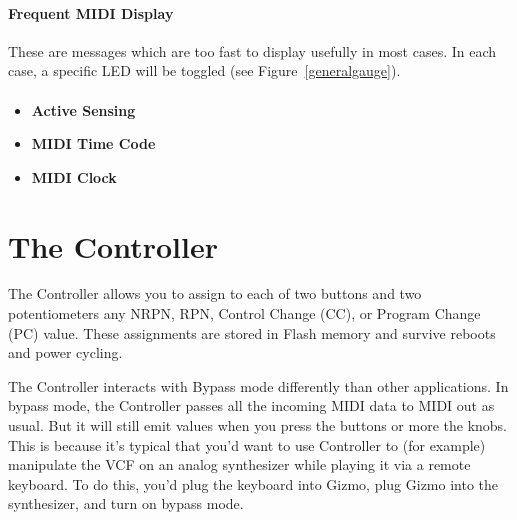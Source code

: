 \documentclass{article}
\begin{document}
\paragraph{Frequent MIDI Display}  These are messages which are too fast to display usefully in most cases.  In each case, a specific LED will be toggled (see Figure~\ref{generalgauge}).

\paragraph{}\vspace{-2em}\begin{itemize}
\item {\bf Active Sensing}
\item {\bf MIDI Time Code}
\item {\bf MIDI Clock}
\end{itemize}



\section {The Controller}
\label{controller}
The Controller allows you to assign to each of two buttons and two potentiometers any NRPN, RPN, Control Change (CC), or Program Change (PC) value.  These assignments are stored in Flash memory and survive reboots and power cycling.

The Controller interacts with Bypass mode differently than other applications.  In bypass mode, the Controller passes all the incoming MIDI data to MIDI out as usual.  But it will still emit values when you press the buttons or more the knobs.  This is because it's typical that you'd want to use Controller to (for example) manipulate the VCF on an analog synthesizer while playing it via a remote keyboard.  To do this, you'd plug the keyboard into Gizmo, plug Gizmo into the synthesizer, and turn on bypass mode.
\end{document}
